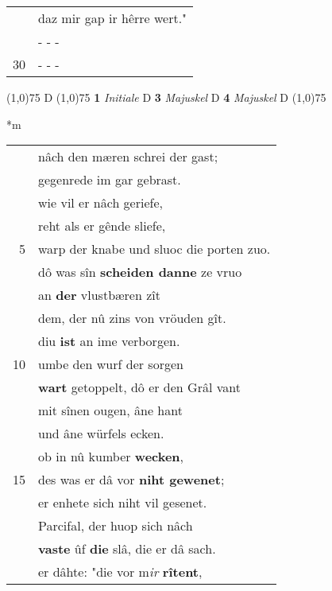 \documentclass[8pt,a4paper,notitlepage]{article}
\begin{document}
\begin{table}[ht]
\begin{minipage}[t]{0.5\linewidth}
\begin{tabular}{rl}
 & daz mir gap ir hêrre wert."\\ 
 & \multicolumn{1}{l}{ - - - }\\ 
30 & \multicolumn{1}{l}{ - - - }\\ 
\end{tabular}
\scriptsize
\line(1,0){75} \newline
D \newline
\line(1,0){75} \newline
\textbf{1} \textit{Initiale} D  \textbf{3} \textit{Majuskel} D  \textbf{4} \textit{Majuskel} D  \newline
\line(1,0){75} \newline
\newline
\end{minipage}
\hspace{0.5cm}
\begin{minipage}[t]{0.5\linewidth}
\small
\begin{center}*m
\end{center}
\begin{tabular}{rl}
 & nâch den mæren schrei der gast;\\ 
 & gegenrede im gar gebrast.\\ 
 & wie vil er nâch geriefe,\\ 
 & reht als er gênde sliefe,\\ 
5 & warp der knabe und sluoc die porten zuo.\\ 
 & dô was sîn \textbf{scheiden danne} ze vruo\\ 
 & an \textbf{der} vlustbæren zît\\ 
 & dem, der nû zins von vröuden gît.\\ 
 & diu \textbf{ist} an ime verborgen.\\ 
10 & umbe den wurf der sorgen\\ 
 & \textbf{wart} getoppelt, dô er den Grâl vant\\ 
 & mit sînen ougen, âne hant\\ 
 & und âne würfels ecken.\\ 
 & ob in nû kumber \textbf{wecken},\\ 
15 & des was er dâ vor \textbf{niht gewenet};\\ 
 & er enhete sich niht vil gesenet.\\ 
 & Parcifal, der huop sich nâch\\ 
 & \textbf{vaste} ûf \textbf{die} slâ, die er dâ sach.\\ 
 & er dâhte: "die vor m\textit{ir} \textbf{rîtent},\\ 

\end{tabular}
\end{minipage}
\end{table}
\end{document}
